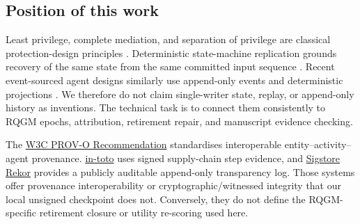 \subsection{Position of this work}\label{sec:related:foundations}

Least privilege, complete mediation, and separation of privilege are
classical protection-design principles \cite{saltzer1975protection}.
Deterministic state-machine replication grounds recovery of the same
state from the same committed input sequence
\cite{schneider1990implementing}. Recent event-sourced agent designs
similarly use append-only events and deterministic projections
\cite{nakajima2026the}. We therefore do not claim single-writer state,
replay, or append-only history as inventions. The technical task is to
connect them consistently to RQGM epochs, attribution, retirement repair,
and manuscript evidence checking.

The \href{https://www.w3.org/TR/prov-o/}{W3C PROV-O Recommendation}
standardises interoperable entity--activity--agent provenance.
\href{https://www.usenix.org/conference/usenixsecurity19/presentation/torres-arias}{in-toto}
uses signed supply-chain step evidence, and
\href{https://docs.sigstore.dev/logging/overview/}{Sigstore Rekor}
provides a publicly auditable append-only transparency log. Those systems
offer provenance interoperability or cryptographic/witnessed integrity that
our local unsigned checkpoint does not. Conversely, they do not define the
RQGM-specific retirement closure or utility re-scoring used here.


